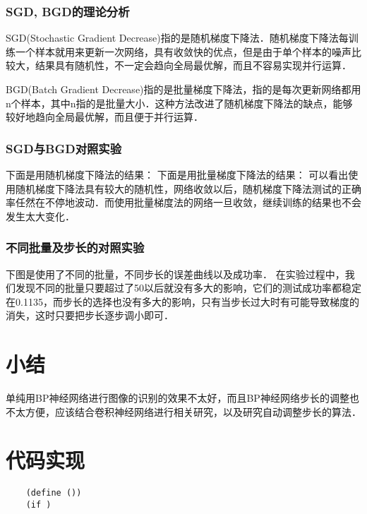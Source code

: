 \documentclass[UTF8]{article}
\begin{document}
  \subsubsection{SGD, BGD的理论分析}
  SGD(Stochastic Gradient Decrease)指的是随机梯度下降法．随机梯度下降法每训练一个样本就用来更新一次网络，具有收敛快的优点，但是由于单个样本的噪声比较大，结果具有随机性，不一定会趋向全局最优解，而且不容易实现并行运算．

  BGD(Batch Gradient Decrease)指的是批量梯度下降法，指的是每次更新网络都用n个样本，其中n指的是批量大小．这种方法改进了随机梯度下降法的缺点，能够较好地趋向全局最优解，而且便于并行运算．
  \subsubsection{SGD与BGD对照实验}
  下面是用随机梯度下降法的结果：
  下面是用批量梯度下降法的结果：
  可以看出使用随机梯度下降法具有较大的随机性，网络收敛以后，随机梯度下降法测试的正确率任然在不停地波动．而使用批量梯度法的网络一旦收敛，继续训练的结果也不会发生太大变化．
  \subsubsection{不同批量及步长的对照实验}
  下图是使用了不同的批量，不同步长的误差曲线以及成功率．
  在实验过程中，我们发现不同的批量只要超过了50以后就没有多大的影响，它们的测试成功率都稳定在0.1135，而步长的选择也没有多大的影响，只有当步长过大时有可能导致梯度的消失，这时只要把步长逐步调小即可．
  \section{小结}
  单纯用BP神经网络进行图像的识别的效果不太好，而且BP神经网络步长的调整也不太方便，应该结合卷积神经网络进行相关研究，以及研究自动调整步长的算法．

  \section{代码实现}
  
  \lstset{language=Scheme}
  \begin{lstlisting}
    (define ())
    (if )
  \end{lstlisting}
\end{document}
